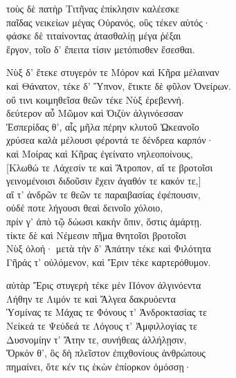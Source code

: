 \quad{}τοὺς δὲ πατὴρ Τιτῆνας ἐπίκλησιν καλέεσκε\\
παῖδας νεικείων μέγας Οὐρανός, οὓς τέκεν αὐτός· \\
φάσκε δὲ τιταίνοντας ἀτασθαλίῃ μέγα ῥέξαι\\
ἔργον, τοῖο δ' ἔπειτα τίσιν μετόπισθεν ἔσεσθαι. 

\quad{}Νὺξ δ' ἔτεκε στυγερόν τε Μόρον καὶ Κῆρα μέλαιναν \\
καὶ Θάνατον, τέκε δ' Ὕπνον, ἔτικτε δὲ φῦλον Ὀνείρων. \\
οὔ τινι κοιμηθεῖσα θεῶν τέκε Νὺξ ἐρεβεννή. \\
δεύτερον αὖ Μῶμον καὶ Ὀιζὺν ἀλγινόεσσαν\\
Ἑσπερίδας θ', αἷς μῆλα πέρην κλυτοῦ Ὠκεανοῖο  \\
χρύσεα καλὰ μέλουσι φέροντά τε δένδρεα καρπόν·\\
καὶ Μοίρας καὶ Κῆρας ἐγείνατο νηλεοποίνους,\\
{[}Κλωθώ τε Λάχεσίν τε καὶ Ἄτροπον, αἵ τε βροτοῖσι \\
γεινομένοισι διδοῦσιν ἔχειν ἀγαθόν τε κακόν τε,{]} \\
αἵ τ' ἀνδρῶν τε θεῶν τε παραιβασίας ἐφέπουσιν,  \\
οὐδέ ποτε λήγουσι θεαὶ δεινοῖο χόλοιο,\\
πρίν γ' ἀπὸ τῷ δώωσι κακὴν ὄπιν, ὅστις ἁμάρτῃ.\\
τίκτε δὲ καὶ Νέμεσιν πῆμα θνητοῖσι βροτοῖσι \\
Νὺξ ὀλοή· μετὰ τὴν δ' Ἀπάτην τέκε καὶ Φιλότητα \\
Γῆράς τ' οὐλόμενον, καὶ Ἔριν τέκε καρτερόθυμον. 

\quad{}αὐτὰρ Ἔρις στυγερὴ τέκε μὲν Πόνον ἀλγινόεντα\\
Λήθην τε Λιμόν τε καὶ Ἄλγεα δακρυόεντα\\
Ὑσμίνας τε Μάχας τε Φόνους τ' Ἀνδροκτασίας τε\\
Νείκεά τε Ψεύδεά τε Λόγους τ' Ἀμφιλλογίας τε \\
Δυσνομίην τ' Ἄτην τε, συνήθεας ἀλλήλῃσιν, \\
Ὅρκόν θ', ὃς δὴ πλεῖστον ἐπιχθονίους ἀνθρώπους\\
πημαίνει, ὅτε κέν τις ἑκὼν ἐπίορκον ὀμόσσῃ· 

